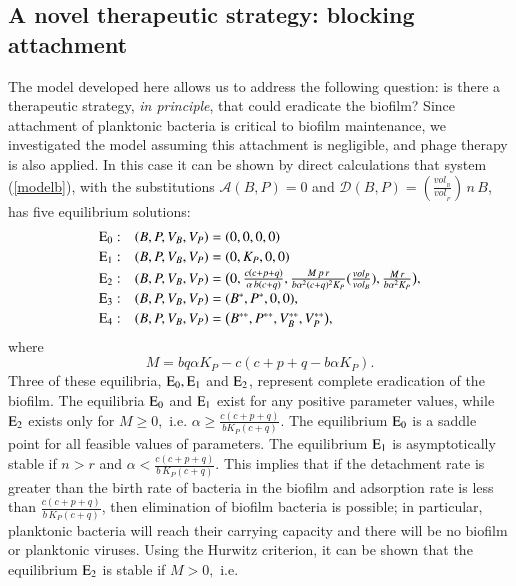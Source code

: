 \subsection{A novel therapeutic strategy: blocking attachment}\label{3}
The model developed here allows us to address the following question: is there a therapeutic strategy, {\it in principle}, that could eradicate the biofilm?  Since attachment of planktonic bacteria is critical to biofilm maintenance, we investigated the model assuming this attachment is negligible, and phage therapy is also applied.
In this case it can be shown by direct calculations that system (\ref{modelb}), with the substitutions $\mathcal{A}(B,P)=0$ and $\mathcal{D}(B,P)=\left(\frac{vol_ {_{B}}}{vol_{_{P}}}\right)\, n\,B$, has five equilibrium solutions: 
\begin{equation}\label{Eqn52}  
\begin{array}{ll}  
{\rm E_0}: & (B,P,V_B,V_P) = (0,0,0,0) \\[0.5ex]  
{\rm E_1}: & (B,P,V_B,V_P) = (0,K_{P},0,0) \\[0.5ex]  
{\rm E_2}: & (B,P,V_B,V_P) = \big(0, 
\frac {c \left( c+p+q \right) }{\alpha\,b \left( c+q \right) }, 
\textstyle\frac{M\,p\, r} {b\alpha^2 (c+q)^2 K_P} 
 (\frac{vol_P}{vol_B}), \frac{M\,r}{b \alpha^2 K_P} 
\big),  \\[0.5ex]  
{\rm E_3}: & (B,P,V_B,V_P) = (B^*,P^*, 0, 0 ),  \\[0.5ex]  
{\rm E_4}: & (B,P,V_B,V_P) = \big( B^{**},P^{**},V_B^{**},V_P^{**} \big), 
\end{array} 
\end{equation} 
where 
\begin{equation}\label{Eqn3}  
M= b q \alpha K_P - c (c+p+q - b \alpha K_P) .
\end{equation}
Three of these equilibria, ${\rm E_{0}}, {\rm E_{1}}$ and ${\rm E_{2}}$, represent complete eradication of the biofilm. The equilibria ${\rm E_0}$ and ${\rm E_1}$ exist for any positive parameter values, while ${\rm E_2}$ exists only for $M \ge 0,$ i.e. $\alpha \ge \frac{c(c+p+q)}{b K_{P} (c+q)}.$ The equilibrium ${\rm E_{0}}$ is a saddle point for all feasible values of parameters. The equilibrium ${\rm E_{1}}$ is asymptotically stable if $n>r$ and $ \alpha <\frac{c\left(c+p+q\right)}{b\,K_{P}(c+q)}.$   This implies that if the detachment rate is greater than the birth rate of bacteria in the biofilm and adsorption rate is less than $\frac{c\left(c+p+q\right)}{b\,K_{P}(c+q)}$, then elimination of biofilm bacteria is possible; in particular, planktonic bacteria will reach their carrying capacity and there will be no biofilm or planktonic viruses.   Using the Hurwitz criterion, it can be shown that the equilibrium ${\rm E_2}$ is stable if $ M > 0 ,$  i.e. 

